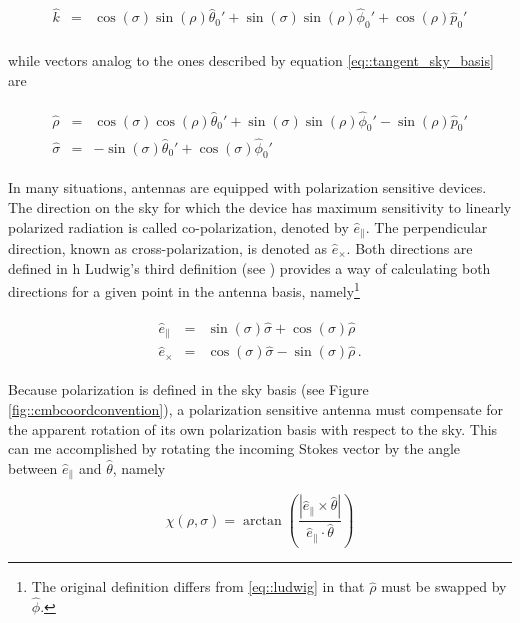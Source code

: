 \documentclass[a4paper,fleqn]{cas-dc}\sloppy
\newcommand{\co}{\mathbin{\|}}
\newcommand{\cx}{\mathbin{\times}}
\begin{document}
\begin{equation}
\begin{aligned}
\hat{k}       &=&  \cos(\sigma)\sin(\rho)\hat{\theta}_0' + \sin(\sigma)\sin(\rho) \hat{\phi}_0' + \cos(\rho) \hat{p}_0' \\
\end{aligned}
\end{equation}

\noindent
while vectors analog to the ones described by equation \ref{eq::tangent_sky_basis} are

\begin{eqnarray}
\begin{aligned}
\hat{\rho}    &=&  \cos(\sigma)\cos(\rho)\hat{\theta}_0' + \sin(\sigma)\sin(\rho) \hat{\phi}_0' - \sin(\rho) \hat{p}_0' \\
\hat{\sigma}  &=& -\sin(\sigma)\hat{\theta}_0' + \cos(\sigma)\hat{\phi}_0'
\end{aligned}
\end{eqnarray}

In many situations, antennas are equipped with polarization sensitive devices. The direction on the sky for which the device has maximum sensitivity to linearly polarized radiation is called co-polarization, denoted by $\hat{e}_{\co}$. The perpendicular direction, known as cross-polarization, is denoted as $\hat{e}_{\cx}$.
Both directions are defined in h Ludwig's third definition (see \cite{1140406}) provides a way of calculating both directions for a given point in the antenna basis, namely\footnote{The original definition differs from \ref{eq::ludwig} in that $\hat{\rho}$ must be swapped by $\hat{\phi}$.}

\begin{eqnarray}
\begin{aligned}
\hat{e}_{\co} &=& \sin(\sigma) \hat{\sigma} + \cos(\sigma) \hat{\rho} \\
\hat{e}_{\cx} &=& \cos(\sigma) \hat{\sigma} - \sin(\sigma) \hat{\rho} \, .
\end{aligned}
\label{eq::ludwig}
\end{eqnarray}

Because polarization is defined in the sky basis (see Figure \ref{fig::cmbcoordconvention}), a polarization sensitive antenna must compensate for the apparent rotation of its own polarization basis with respect to the sky. This can me accomplished by rotating the incoming Stokes vector by the angle between $\hat{e}_{\co}$ and $\hat{\theta}$, namely

\begin{equation}
\chi(\rho,\sigma) = \arctan \left( \frac{ |\hat{e}_{\co} \times \hat{\theta}| }{ \hat{e}_{\co} \cdot \hat{\theta} } \right)
\label{eq::chi}
\end{equation}
\end{document}
